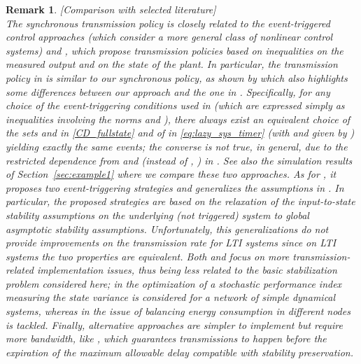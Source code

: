 \documentclass[twocolumn]{autart}
\newtheorem{remm}{Remark}
\newenvironment{remark}{\begin{remm}\rm }{\hfill \hspace*{1pt} \hfill \end{remm}}
\begin{document}
{
\begin{remark}[\emph{Comparison with selected literature}] \\
The synchronous transmission policy is closely related to the
event-triggered control approaches 
\cite{Anta08,Anta10,Seuret11,Tabuada07,Wang08a} (which consider a more 
general class of nonlinear control systems) and \cite{Cervin08,Mazo08},
which propose transmission policies based on inequalities on the
measured output and on the state of the plant.
In particular, the transmission policy in \cite[Section IV]{Tabuada07} 
is similar to our synchronous policy, as shown by \cite[Equation (13)]{Tabuada07}
which also highlights some differences between our approach and the one in \cite{Tabuada07}. 
Specifically, for any choice of the event-triggering conditions used in \cite{Tabuada07} 
(which are expressed simply as inequalities involving the norms  and ),
there always exist an equivalent choice of the sets  
and  in \eqref{CD_fullstate} and of  in \eqref{eq:lazy_sys_timer}
(with  and  given by \cite[Corollary IV.1]{Tabuada07}) yielding exactly the same events;
the converse is not true, in general, due to the restricted dependence from  and 
(instead of , ) in \cite{Tabuada07}. { See also the simulation results of Section~\ref{sec:example1} 
where we compare these two approaches.}
As for \cite{Seuret11}, it proposes two event-triggering strategies and generalizes the 
assumptions in \cite{Anta08,Anta10,Tabuada07,Wang08a}.
In particular, the proposed strategies are based on the  
relaxation of the input-to-state stability assumptions on the underlying (not triggered) system
to global asymptotic stability assumptions. Unfortunately, this generalizations
do not provide improvements on the transmission rate for LTI systems since 
on LTI systems the two properties are equivalent.
Both \cite{Cervin08} and \cite{Mazo08} focus on more transmission-related implementation issues,
thus being less related to the basic stabilization problem considered here;
in \cite{Cervin08} the optimization of a stochastic performance index 
measuring the state variance is considered 
for a network of simple dynamical systems, whereas in \cite{Mazo08}
the issue of balancing energy consumption in different nodes is tackled.
Finally, alternative approaches are simpler to implement but require more bandwidth,
like \cite{Carnevale07}, which guarantees transmissions to happen 
before the expiration of the maximum allowable delay compatible with stability preservation.


\end{remark}}
\end{document}
